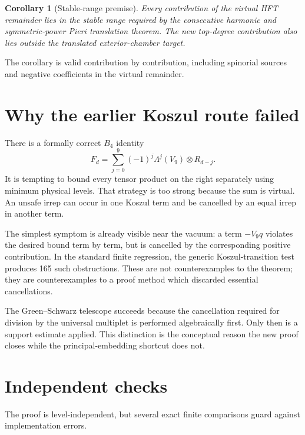 \documentclass[11pt,a4paper]{article}
\newtheorem{corollary}[theorem]{Corollary}
\theoremstyle{definition}
\begin{document}
\begin{corollary}[Stable-range premise]
Every contribution of the virtual HFT remainder lies in the stable range
required by the consecutive harmonic and symmetric-power Pieri translation
theorem.  The new top-degree contribution also lies outside the translated
exterior-chamber target.
\end{corollary}

The corollary is valid contribution by contribution, including spinorial
sources and negative coefficients in the virtual remainder.

\section{Why the earlier Koszul route failed}

There is a formally correct $B_4$ identity
\[
   F_d=\sum_{j=0}^{9}(-1)^j\Lambda^j(V_9)\otimes R_{d-j}.
\]
It is tempting to bound every tensor product on the right separately using
minimum physical levels.  That strategy is too strong because the sum is
virtual.  An unsafe irrep can occur in one Koszul term and be cancelled by an
equal irrep in another term.

The simplest symptom is already visible near the vacuum: a term
$-V_9q$ violates the desired bound term by term, but is cancelled by the
corresponding positive contribution.  In the standard finite regression,
the generic Koszul-transition test produces 165 such obstructions.  These
are not counterexamples to the theorem; they are counterexamples to a proof
method which discarded essential cancellations.

The Green--Schwarz telescope succeeds because the cancellation required for
division by the universal multiplet is performed algebraically first.  Only
then is a support estimate applied.  This distinction is the conceptual
reason the new proof closes while the principal-embedding shortcut does not.

\section{Independent checks}

The proof is level-independent, but several exact finite comparisons guard
against implementation errors.
\end{document}
